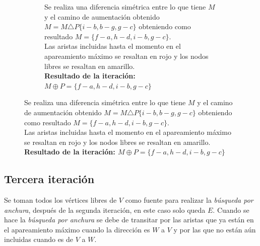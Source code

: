 \documentclass[12pt,a4paper]{article}
\begin{document}
\begin{center}
\begin{figure}[!htb]
\begin{minipage}{.45\linewidth}
\begin{subfigure}[t]{.9\linewidth}
	\captionsetup{belowskip=0pt}
                \captionsetup{justification=centering}
    		\caption{\footnotesize Se realiza una diferencia simétrica entre lo que tiene $M$ y el camino de aumentación obtenido $M=M \triangle P\{i-b,b-g,g-c\}$ obteniendo como resultado $M=\{f-a,h-d,i-b,g-c\}$.\\Las aristas incluidas hasta el momento en el apareamiento máximo se resaltan en rojo y los nodos libres se resaltan en amarillo.\\ \vspace{0.50cm} \normalsize \textbf{Resultado de la iteración: $M \oplus P = \{f-a,h-d,i-b,g-c\}$}}
            \end{subfigure}
        \end{minipage}
\end{figure}
\end{center}

\subsection{Tercera iteración} \noindent
Se toman todos los vértices libres de $V$ como fuente para realizar la \textit{búsqueda por anchura}, después de la segunda iteración, en este caso solo queda $E$. Cuando se hace la \textit{búsqueda por anchura} se debe de transitar por las aristas que ya están en el apareamiento máximo cuando la dirección es $W$ a $V$ y por las que no están aún incluidas cuando es de $V$ a $W$. 
\end{document}
